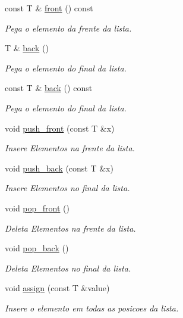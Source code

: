 \begin{DoxyCompactItemize}
const T \& \hyperlink{class_forward__list_a5bfa5ba82db8a60b3477e36e1455baa2}{front} () const 
\begin{DoxyCompactList}\small\item\em Pega o elemento da frente da lista. \end{DoxyCompactList}\item 
T \& \hyperlink{class_forward__list_acd6cd5c5bf33df552796be306ccdf11c}{back} ()
\begin{DoxyCompactList}\small\item\em Pega o elemento do final da lista. \end{DoxyCompactList}\item 
const T \& \hyperlink{class_forward__list_ad38f7c3c99bd5cd5726e060c81687828}{back} () const 
\begin{DoxyCompactList}\small\item\em Pega o elemento do final da lista. \end{DoxyCompactList}\item 
void \hyperlink{class_forward__list_a0774f069e39bc80136d2c78e77b75aee}{push\+\_\+front} (const T \&x)
\begin{DoxyCompactList}\small\item\em Insere Elementos na frente da lista. \end{DoxyCompactList}\item 
void \hyperlink{class_forward__list_a51faf6177fe22a6762362bdeda69c5c8}{push\+\_\+back} (const T \&x)
\begin{DoxyCompactList}\small\item\em Insere Elementos no final da lista. \end{DoxyCompactList}\item 
void \hyperlink{class_forward__list_a7abff5d3df864ba0a82da91bff676261}{pop\+\_\+front} ()
\begin{DoxyCompactList}\small\item\em Deleta Elementos na frente da lista. \end{DoxyCompactList}\item 
void \hyperlink{class_forward__list_a503678bac3a83b4cb48ba4628c11c8a7}{pop\+\_\+back} ()
\begin{DoxyCompactList}\small\item\em Deleta Elementos no final da lista. \end{DoxyCompactList}\item 
void \hyperlink{class_forward__list_ace9a774c6f8ec3cd2b79b61a25b372f2}{assign} (const T \&value)
\begin{DoxyCompactList}\small\item\em Insere o elemento em todas as posicoes da lista. \end{DoxyCompactList}\item 

\end{DoxyCompactItemize}
